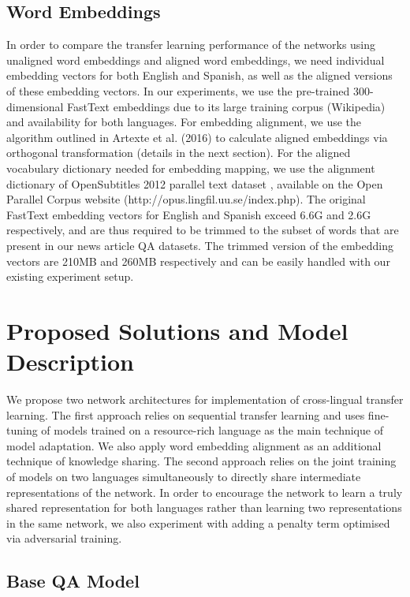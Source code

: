 \documentclass[]{article}
\begin{document}
\subsection{Word Embeddings}

In order to compare the transfer learning performance of the networks using unaligned word embeddings and aligned word embeddings, we need individual embedding vectors for both English and Spanish, as well as the aligned versions of these embedding vectors. In our experiments, we use the pre-trained 300-dimensional FastText embeddings \cite{bojanowski2016enriching} due to its large training corpus (Wikipedia) and availability for both languages. For embedding alignment, we use the algorithm outlined in Artexte et al. (2016) \cite{artetxe2016learning} to calculate aligned embeddings via orthogonal transformation (details in the next section). For the aligned vocabulary dictionary needed for embedding mapping, we use the alignment dictionary of OpenSubtitles 2012 parallel text dataset \cite{TIEDEMANN12.463}, available on the Open Parallel Corpus website (http://opus.lingfil.uu.se/index.php). The original FastText embedding vectors for English and Spanish exceed 6.6G and 2.6G respectively, and are thus required to be trimmed to the subset of words that are present in our news article QA datasets. The trimmed version of the embedding vectors are 210MB and 260MB respectively and can be easily handled with our existing experiment setup.



\section{Proposed Solutions and Model Description}

We propose two network architectures for implementation of cross-lingual transfer learning. The first approach relies on sequential transfer learning and uses fine-tuning of models trained on a resource-rich language as the main technique of model adaptation. We also apply word embedding alignment as an additional technique of knowledge sharing. The second approach relies on the joint training of models on two languages simultaneously to directly share intermediate representations of the network. In order to encourage the network to learn a truly shared representation for both languages rather than learning two representations in the same network, we also experiment with adding a penalty term optimised via adversarial training.

\subsection{Base QA Model}
\end{document}
